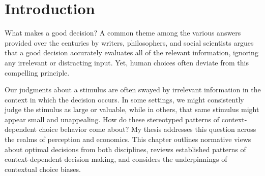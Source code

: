 \documentclass[a4paper, nobind]{templates/ociamthesis}
\begin{document}
\begin{romanpages}
  \dominitoc %

\flushbottom

\tableofcontents

\listoffigures
	\mtcaddchapter


\end{romanpages}

\flushbottom

\hypertarget{introduction}{%
\chapter{Introduction}\label{introduction}}

\minitoc

What makes a good decision? A common theme among the various answers provided over the centuries by writers, philosophers, and social scientists argues that a good decision accurately evaluates all of the relevant information, ignoring any irrelevant or distracting input. Yet, human choices often deviate from this compelling principle.

Our judgments about a stimulus are often swayed by irrelevant information in the context in which the decision occurs. In some settings, we might consistently judge the stimulus as large or valuable, while in others, that same stimulus might appear small and unappealing. How do these stereotyped patterns of context-dependent choice behavior come about? My thesis addresses this question across the realms of perception and economics. This chapter outlines normative views about optimal decisions from both disciplines, reviews established patterns of context-dependent decision making, and considers the underpinnings of contextual choice biases.
\end{document}

